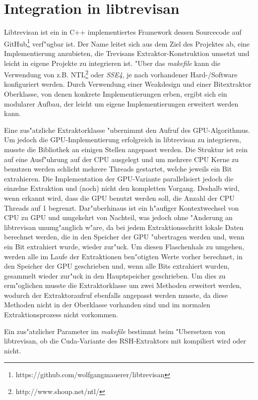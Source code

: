 \section{Integration in libtrevisan}

Libtrevisan ist ein in C++ implementiertes Framework dessen Sourcecode auf GitHub\footnote{https://github.com/wolfgangmauerer/libtrevisan} verf"ugbar ist. Der Name leitet sich aus dem Ziel des Projektes ab, eine Implementierung anzubieten, die Trevisans Extraktor-Konstruktion umsetzt und leicht in eigene Projekte zu integrieren ist. "Uber das \emph{makefile} kann die Verwendung von z.B. NTL\footnote{http://www.shoup.net/ntl/} oder \emph{SSE4}, je nach vorhandener Hard-/Software konfiguriert werden. Durch Verwendung einer Weakdesign und einer Bitextraktor Oberklasse, von denen konkrete Implementierungen erben, ergibt sich ein modularer Aufbau, der leicht um eigene Implementierungen erweitert werden kann.

Eine zus"atzliche Extraktorklasse "ubernimmt den Aufruf des GPU-Algorithmus. Um jedoch die GPU-Implementierung erfolgreich in libtrevisan zu integrieren, musste die Bibliothek an einigen Stellen angepasst werden. Die Struktur ist rein auf eine Ausf"uhrung auf der CPU ausgelegt und um mehrere CPU Kerne zu benutzen werden schlicht mehrere Threads gestartet, welche jeweils ein Bit extrahieren. Die Implementation der GPU-Variante parallelisiert jedoch die einzelne Extraktion und (noch) nicht den kompletten Vorgang. Deshalb wird, wenn erkannt wird, dass die GPU benutzt werden soll, die Anzahl der CPU Threads auf 1 begrenzt. Dar"uberhinaus ist ein h"aufiger Kontextwechsel von CPU zu GPU und umgekehrt von Nachteil, was jedoch ohne "Anderung an libtrevisan unumg"anglich w"are, da bei jedem Extraktionsschritt lokale Daten berechnet werden, die in den Speicher der GPU "ubertragen werden und, wenn ein Bit extrahiert wurde, wieder zur"uck. Um diesen Flaschenhals zu umgehen, werden alle im Laufe der Extraktionen ben"otigten Werte vorher berechnet, in den Speicher der GPU geschrieben und, wenn alle Bits extrahiert wurden, gesammelt wieder zur"uck in den Hauptspeicher geschrieben. Um dies zu erm"oglichen musste die Extraktorklasse um zwei Methoden erweitert werden, wodurch der Extraktoraufruf ebenfalls angepasst werden musste, da diese Methoden nicht in der Oberklasse vorhanden sind und im normalen Extraktionsprozess nicht vorkommen.


Ein zus"atzlicher Parameter im \emph{makefile} bestimmt beim "Ubersetzen von libtrevisan, ob die Cuda-Variante des RSH-Extraktors mit kompiliert wird oder nicht.
